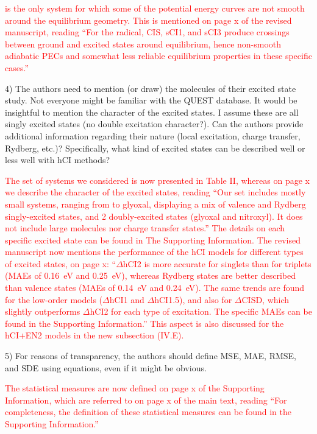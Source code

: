 \documentclass[10pt]{letter}
\newcommand{\alert}[1]{\textcolor{red}{#1}}
\begin{document}
\begin{letter}
\alert{
 is the only system for which some of the potential energy curves are not smooth around the equilibrium geometry.
This is mentioned on page x of the revised manuscript, reading
``For the \ce{CN} radical, CIS, sCI1, and sCI3 produce crossings between ground and excited states around equilibrium, hence non-smooth adiabatic PECs
and somewhat less reliable equilibrium properties in these specific cases.''
}

\clearpage

{4) The authors need to mention (or draw) the molecules of their excited state study. Not everyone might be familiar with the QUEST database. It would be insightful to mention the character of the excited states. I assume these are all singly excited states (no double excitation character?). Can the authors provide additional information regarding their nature (local excitation, charge transfer, Rydberg, etc.)? Specifically, what kind of excited states can be described well or less well with hCI methods?
}

\alert{
The set of systems we considered is now presented in Table II, whereas on page x we describe the character of the excited states, reading
``Our set includes mostly small systems, ranging from \ce{BH} to glyoxal, displaying a mix of valence and Rydberg singly-excited states,
and 2 doubly-excited states (glyoxal and nitroxyl). It does not include large molecules nor charge transfer states.''
The details on each specific excited state can be found in The Supporting Information.
The revised manuscript now mentions the performance of the hCI models for different types of excited states, on page x:
``$\Delta$hCI2 is more accurate for singlets than for triplets (MAEs of \SI{0.16}{\eV} and \SI{0.25}{\eV}),
whereas Rydberg states are better described than valence states (MAEs of \SI{0.14}{\eV} and \SI{0.24}{\eV}).
The same trends are found for the low-order models ($\Delta$hCI1 and $\Delta$hCI1.5), and also for $\Delta$CISD, which slightly outperforms $\Delta$hCI2 for each type of excitation.
The specific MAEs can be found in the Supporting Information.''
This aspect is also discussed for the hCI+EN2 models in the new subsection (IV.E).
}

{5) For reasons of transparency, the authors should define MSE, MAE, RMSE, and SDE using equations, even if it might be obvious.
}

\alert{
The statistical measures are now defined on page x of the Supporting Information, which are referred to on page x of the main text, reading
``For completeness, the definition of these statistical measures can be found in the Supporting Information.''
}


\end{letter}
\end{document}
